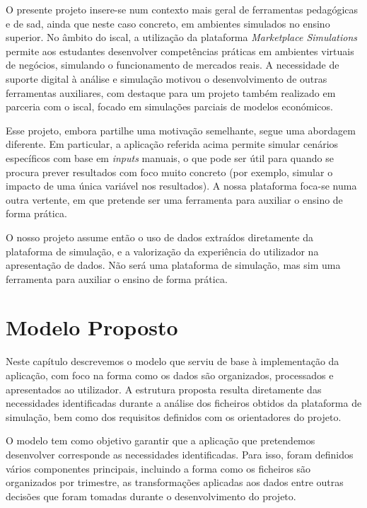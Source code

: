 O presente projeto insere-se num contexto mais geral de ferramentas pedagógicas e de \gls{sad}, ainda que neste caso concreto, em ambientes simulados no ensino superior. No âmbito do \gls{iscal}, a utilização da plataforma \textit{Marketplace Simulations} permite aos estudantes desenvolver competências práticas em ambientes virtuais de negócios, simulando o funcionamento de mercados reais. A necessidade de suporte digital à análise e simulação motivou o desenvolvimento de outras ferramentas auxiliares, com destaque para um projeto também realizado em parceria com o \gls{iscal}, focado em simulações parciais de modelos económicos.

Esse projeto, embora partilhe uma motivação semelhante, segue uma abordagem diferente. Em particular, a aplicação referida acima permite simular cenários específicos com base em \textit{inputs} manuais, o que pode ser útil para quando se procura prever resultados com foco muito concreto (por exemplo, simular o impacto de uma única variável nos resultados). A nossa plataforma foca-se numa outra vertente, em que pretende ser uma ferramenta para auxiliar o ensino de forma prática.

O nosso projeto assume então o uso de dados extraídos diretamente da plataforma de simulação, e a valorização da experiência do utilizador na apresentação de dados. Não será uma plataforma de simulação, mas sim uma ferramenta para auxiliar o ensino de forma prática.

\chapter{Modelo Proposto}
\label{ch:modeloProposto}

Neste capítulo descrevemos o modelo que serviu de base à implementação da aplicação, com foco na forma como os dados são organizados, processados e apresentados ao utilizador. A estrutura proposta resulta diretamente das necessidades identificadas durante a análise dos ficheiros obtidos da plataforma de simulação, bem como dos requisitos definidos com os orientadores do projeto.

O modelo tem como objetivo garantir que a aplicação que pretendemos desenvolver corresponde as necessidades identificadas. Para isso, foram definidos vários componentes principais, incluindo a forma como os ficheiros são organizados por trimestre, as transformações aplicadas aos dados entre outras decisões que foram tomadas durante o desenvolvimento do projeto.

